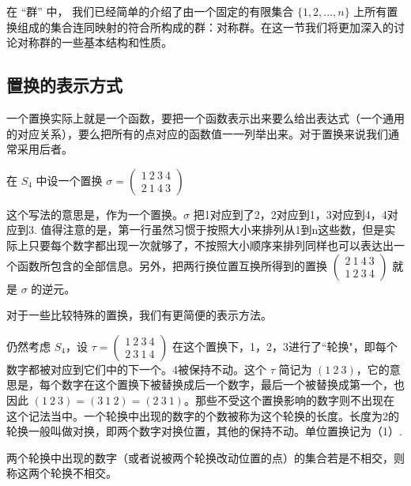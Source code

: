 

在 “群” 中， 我们已经简单的介绍了由一个固定的有限集合 $\{1, 2, ..., n\}$ 上所有置换组成的集合连同映射的符合所构成的群：对称群。在这一节我们将更加深入的讨论对称群的一些基本结构和性质。

\subsection{置换的表示方式}
一个置换实际上就是一个函数，要把一个函数表示出来要么给出表达式（一个通用的对应关系），要么把所有的点对应的函数值一一列举出来。对于置换来说我们通常采用后者。
\begin{example}{}
在 $S_4$ 中设一个置换 $\sigma=\begin{pmatrix}
1\ 2\ 3\ 4\\ 2\ 1\ 4\ 3
\end{pmatrix}$
\end{example}
这个写法的意思是，作为一个置换。$\sigma$ 把1对应到了2，2对应到1，3对应到4，4对应到3. 值得注意的是，第一行虽然习惯于按照大小来排列从1到n这些数，但是实际上只要每个数字都出现一次就够了，不按照大小顺序来排列同样也可以表达出一个函数所包含的全部信息。另外，把两行换位置互换所得到的置换
$\begin{pmatrix}
2\ 1\ 4\ 3\\ 1\ 2\ 3\ 4
\end{pmatrix}$
就是 $\sigma$ 的逆元。


对于一些比较特殊的置换，我们有更简便的表示方法。
\begin{example}{}
仍然考虑 $S_4$，设 $\tau=\begin{pmatrix}
1\ 2\ 3\ 4\\ 2\ 3\ 1\ 4
\end{pmatrix}$ 在这个置换下，1，2，3进行了“轮换"，即每个数字都被对应到它们中的下一个。4被保持不动。这个 $\tau$ 简记为 $(1\ 2\ 3)$，它的意思是，每个数字在这个置换下被替换成后一个数字，最后一个被替换成第一个，也因此 $(1\ 2\ 3)=(3\ 1\ 2)=(2\ 3\ 1)$。那些不受这个置换影响的数字则不出现在这个记法当中。一个轮换中出现的数字的个数被称为这个轮换的长度。长度为2的轮换一般叫做对换，即两个数字对换位置，其他的保持不动。单位置换记为（1）.
\end{example}

\begin{definition}{}
两个轮换中出现的数字（或者说被两个轮换改动位置的点）的集合若是不相交，则称这两个轮换不相交。
\end{definition}

